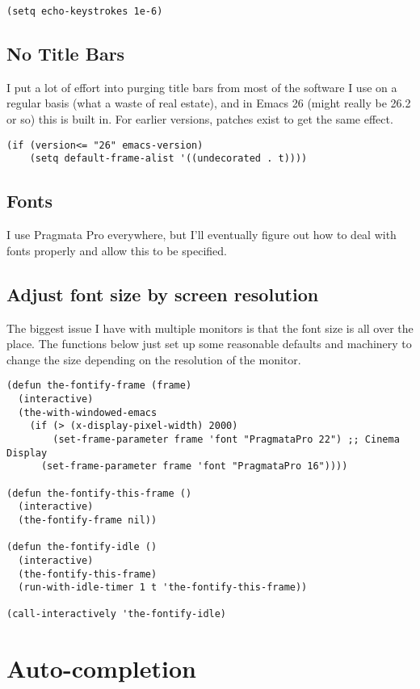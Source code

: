 \documentclass[11pt]{article}
\begin{document}
\begin{verbatim}
(setq echo-keystrokes 1e-6)
\end{verbatim}

\subsection{No Title Bars}
\label{sec:orgf6b5591}
I put a lot of effort into purging title bars from most of the
software I use on a regular basis (what a waste of real estate), and
in Emacs 26 (might really be 26.2 or so) this is built in. For earlier
versions, patches exist to get the same effect.

\begin{verbatim}
(if (version<= "26" emacs-version)
    (setq default-frame-alist '((undecorated . t))))
\end{verbatim}

\subsection{Fonts}
\label{sec:org1f8014a}
I use Pragmata Pro everywhere, but I'll eventually figure out how to
deal with fonts properly and allow this to be specified.

\subsection{Adjust font size by screen resolution}
\label{sec:org4c04a64}
The biggest issue I have with multiple monitors is that the font size
is all over the place. The functions below just set up some reasonable
defaults and machinery to change the size depending on the resolution
of the monitor.

\begin{verbatim}
(defun the-fontify-frame (frame)
  (interactive)
  (the-with-windowed-emacs
    (if (> (x-display-pixel-width) 2000)
        (set-frame-parameter frame 'font "PragmataPro 22") ;; Cinema Display
      (set-frame-parameter frame 'font "PragmataPro 16"))))

(defun the-fontify-this-frame ()
  (interactive)
  (the-fontify-frame nil))

(defun the-fontify-idle ()
  (interactive)
  (the-fontify-this-frame)
  (run-with-idle-timer 1 t 'the-fontify-this-frame))

(call-interactively 'the-fontify-idle)
\end{verbatim}
\section{Auto-completion}
\label{sec:org7dc198e}
\end{document}
